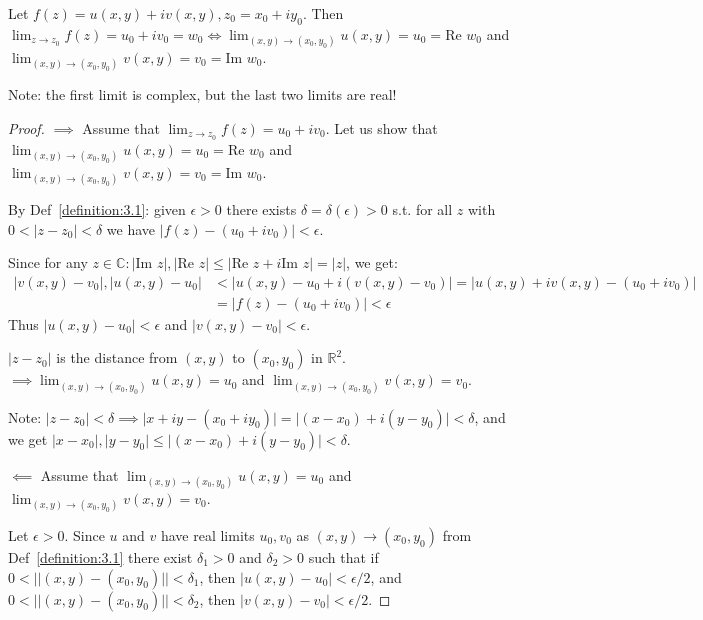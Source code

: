 \begin{proposition}\label{proposition:3.2} Let $f(z) = u(x, y) + iv(x, y), z_0 = x_0 + iy_0$. Then $\lim_{z \to z_0} f(z) = u_0 + iv_0 = w_0 \iff \lim_{(x, y) \to (x_0, y_0)} u(x, y) = u_0 = \text{Re } w_0$ and $\lim_{(x, y) \to (x_0, y_0)} v(x, y) = v_0 = \text{Im } w_0$.
\end{proposition}
Note: the first limit is complex, but the last two limits are real!

\begin{proof}  $\implies$ Assume that $\lim_{z \to z_0} f(z) = u_0 + iv_0$. Let us show that $\lim_{(x, y) \to (x_0, y_0)} u(x, y) = u_0 = \text{Re } w_0$ and $\lim_{(x, y) \to (x_0, y_0)} v(x, y) = v_0 = \text{Im } w_0$.

By Def~\ref{definition:3.1}: given $\epsilon > 0$ there exists $\delta = \delta(\epsilon) > 0$ s.t. for all $z$ with $0 < \vert z - z_0\vert  < \delta$ we have $\vert f(z) - (u_0 + iv_0)\vert  < \epsilon$.

Since for any $z \in \mathbb{C}: \vert \text{Im } z\vert , \vert \text{Re } z\vert  \leq \vert \text{Re } z + i\text{Im } z\vert  = \vert z\vert $, we get:
\begin{align*}
 \vert v(x, y) - v_0\vert , \vert u(x, y) - u_0\vert  & < \vert u(x, y) - u_0 + i(v(x, y) - v_0)\vert  = \vert u(x, y) + iv(x, y) - (u_0 + iv_0)\vert  \\
 & = \vert f(z) - (u_0 + iv_0)\vert  < \epsilon 
 \end{align*}
Thus $\vert u(x, y) - u_0\vert  < \epsilon$ and $\vert v(x, y) - v_0\vert  < \epsilon$.

\checkthis $\vert z - z_0\vert $ is the distance from $(x, y)$ to $(x_0, y_0)$ in $\mathbb{R}^2$.
$\implies \lim_{(x, y) \to (x_0, y_0)} u(x, y) = u_0$ and $\lim_{(x, y) \to (x_0, y_0)} v(x, y) = v_0$.

Note: $\vert z - z_0\vert  < \delta \implies \vert x + iy - (x_0 + iy_0)\vert  = \vert (x - x_0) + i(y - y_0)\vert  < \delta$, and we get $\vert x - x_0\vert , \vert y - y_0\vert  \leq \vert (x - x_0) + i(y - y_0)\vert  < \delta$.

$\impliedby$ Assume that $\lim_{(x,y) \to (x_0, y_0)} u(x, y) = u_0$ and $\lim_{(x, y) \to (x_0, y_0)} v(x, y) = v_0$.

Let $\epsilon > 0$. Since $u$ and $v$ have real limits $u_0, v_0$ as $(x, y) \to (x_0, y_0)$ from Def~\ref{definition:3.1} there exist $\delta_1 > 0$ and $\delta_2 > 0$ such that if $0 < \vert \vert (x, y) - (x_0, y_0)\vert \vert  < \delta_1$, then $\vert u(x, y) - u_0\vert  < \epsilon/2$, and $0 < \vert \vert (x, y) - (x_0, y_0)\vert \vert  < \delta_2$, then $\vert v(x, y) - v_0\vert  < \epsilon/2$.


\end{proof}
